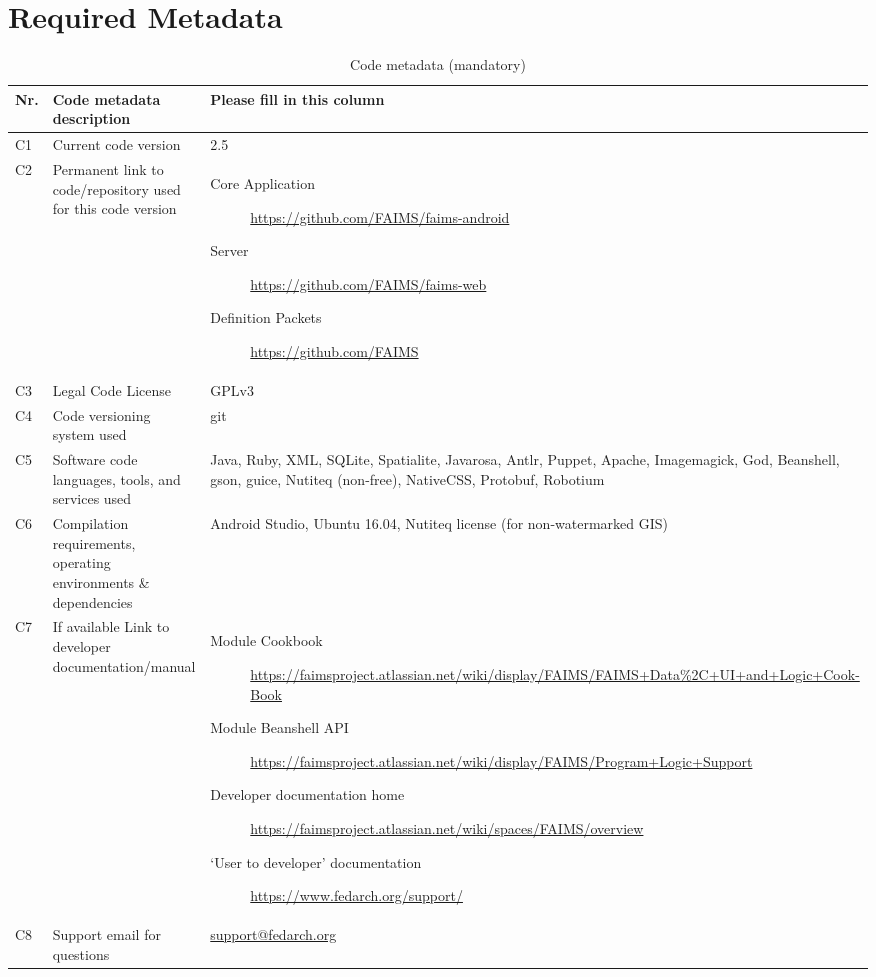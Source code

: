 \documentclass[preprint,12pt, a4paper]{elsarticle}
\begin{document}
\section*{Required Metadata}
\label{}




\begin{table}[!h]
\begin{tabular}{|l|p{6.5cm}|p{6.5cm}|}
\hline
\textbf{Nr.} & \textbf{Code metadata description} & \textbf{Please fill in this column} \\
\hline
C1 & Current code version & 2.5 \\
\hline
C2 & Permanent link to code/repository used for this code version & \begin{description}\item [Core Application] \url{https://github.com/FAIMS/faims-android}
\item [Server] \url{https://github.com/FAIMS/faims-web}
\item [Definition Packets] \url{https://github.com/FAIMS}  
\end{description}
\\
\hline
C3 & Legal Code License   & GPLv3 \\
\hline
C4 & Code versioning system used & git \\
\hline
C5 & Software code languages, tools, and services used & Java, Ruby, XML, SQLite, Spatialite, Javarosa, Antlr, Puppet, Apache, Imagemagick, God, Beanshell, gson, guice, Nutiteq (non-free), NativeCSS, Protobuf, Robotium \\
\hline
C6 & Compilation requirements, operating environments \& dependencies & Android Studio, Ubuntu 16.04, Nutiteq license (for non-watermarked GIS)\\
\hline
C7 & If available Link to developer documentation/manual & \begin{description} \item [Module Cookbook] \url{https://faimsproject.atlassian.net/wiki/display/FAIMS/FAIMS+Data\%2C+UI+and+Logic+Cook-Book} 
\item [Module Beanshell API] \url{https://faimsproject.atlassian.net/wiki/display/FAIMS/Program+Logic+Support}
\item [Developer documentation home] \url{https://faimsproject.atlassian.net/wiki/spaces/FAIMS/overview}
\item [`User to developer' documentation] \url{https://www.fedarch.org/support/} 
\end{description}
 \\
\hline
C8 & Support email for questions & \url{support@fedarch.org} \\
\hline
\end{tabular}
\caption{Code metadata (mandatory)}
\label{} 
\end{table}
\end{document}
